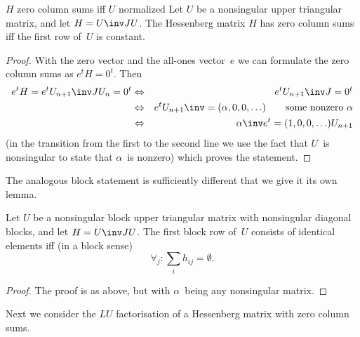 \begin{llemma}{$H$ zero column sums iff $U$ normalized}
\label{Zero-column}\label{H:zero:colsum}
Let $U$ be a nonsingular upper triangular matrix,
and let $H=U\inv JU$.
The Hessenberg matrix $H$ has zero column sums
iff the first row of~$U$ is constant.
\end{llemma}
\begin{proof} With the zero vector and the all-ones vector~$e$ we can
formulate the zero column sums as $e^tH=0^t$. Then
\begin{eqnarray*}
  e^tH=e^tU_{n+1}\inv JU_n=0^t&\Leftrightarrow&e^tU_{n+1}\inv J=0^t\\
  &\Leftrightarrow&e^tU_{n+1}\inv=(\alpha,0,0,\ldots)
  \qquad\hbox{some nonzero $\alpha$}\\
  &\Leftrightarrow&\alpha\inv e^t=(1,0,0,\ldots)U_{n+1}
\end{eqnarray*}
(in the transition from the first to the second line we use the fact that
$U$~is nonsingular to state that $\alpha$~is nonzero)
which proves the statement.\end{proof}

\begin{block}
The analogous block statement is sufficiently different that we give it
its own lemma.
\begin{lemma}
Let $U$ be a nonsingular block upper triangular matrix with nonsingular
diagonal blocks, and let $H=U\inv JU$.
The first block row of~$U$ consists of identical elements
iff (in a block sense)
\begin{equation} \forall_j\colon\sum_ih_{ij}=\emptyset.
    \label{eq:block-H-zero-column}\end{equation}
\end{lemma}
\begin{proof}
The proof is as above, but with $\alpha$~being any nonsingular matrix.
\end{proof}
\end{block}

Next we consider the $LU$ factorisation of a Hessenberg matrix with
zero column sums.

